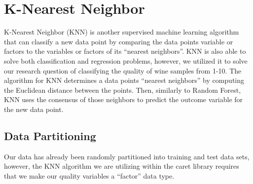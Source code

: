 \documentclass[
]{book}
\newenvironment{Shaded}{\begin{snugshade}}{\end{snugshade}}
\newcommand{\DecValTok}[1]{\textcolor[rgb]{0.00,0.00,0.81}{#1}}
\newcommand{\FunctionTok}[1]{\textcolor[rgb]{0.00,0.00,0.00}{#1}}
\newcommand{\NormalTok}[1]{#1}
\newcommand{\OtherTok}[1]{\textcolor[rgb]{0.56,0.35,0.01}{#1}}
\newcommand{\SpecialCharTok}[1]{\textcolor[rgb]{0.00,0.00,0.00}{#1}}
\newcommand{\StringTok}[1]{\textcolor[rgb]{0.31,0.60,0.02}{#1}}
\begin{document}
\begin{Shaded}
\end{Shaded}

\hypertarget{k-nearest-neighbor}{%
\chapter{K-Nearest Neighbor}\label{k-nearest-neighbor}}

K-Nearest Neighbor (KNN) is another supervised machine learning algorithm that can classify a new data point by comparing the data points variable or factors to the variables or factors of its ``nearest neighbors''. KNN is also able to solve both classification and regression problems, however, we utilized it to solve our research question of classifying the quality of wine samples from 1-10. The algorithm for KNN determines a data points ``nearest neighbors'' by computing the Euclidean distance between the points. Then, similarly to Random Forest, KNN uses the consensus of those neighbors to predict the outcome variable for the new data point. \citet{knn}

\hypertarget{data-partitioning-1}{%
\section{Data Partitioning}\label{data-partitioning-1}}

Our data has already been randomly partitioned into training and test data sets, however, the KNN algorithm we are utilizing within the caret library requires that we make our quality variables a ``factor'' data type.

\begin{Shaded}
\end{Shaded}
\end{document}
